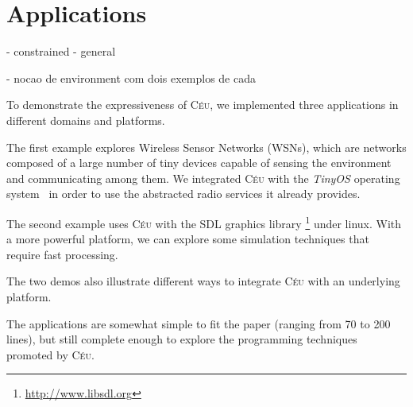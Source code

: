 \documentclass{sigplanconf}
\newcommand{\CEU}{\textsc{C\'{e}u}\xspace}
\newcommand{\1}{\;}
\newcommand{\2}{\;\;}
\newcommand{\3}{\;\;\;}
\newcommand{\5}{\;\;\;\;\;}
\begin{document}

\section{Applications}

- constrained
- general

- nocao de environment com dois exemplos de cada

To demonstrate the expressiveness of \CEU{}, we implemented three applications 
in different domains and platforms.

The first example explores Wireless Sensor Networks (WSNs), which are networks 
composed of a large number of tiny devices capable of sensing the environment 
and communicating among them.
We integrated \CEU with the \emph{TinyOS} operating system~\cite{wsn.tos} in 
order to use the abstracted radio services it already provides.

The second example uses \CEU with the SDL graphics library%
\footnote{\url{http://www.libsdl.org}} under linux.
With a more powerful platform, we can explore some simulation techniques that 
require fast processing.

The two demos also illustrate different ways to integrate \CEU{} with an 
underlying platform.

The applications are somewhat simple to fit the paper (ranging from 70 to 200 
lines), but still complete enough to explore the programming techniques 
promoted by \CEU{}.
\end{document}
